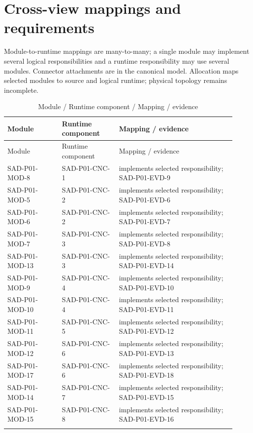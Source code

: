 \documentclass[10pt,letterpaper]{article}
\begin{document}
\section{Cross-view mappings and requirements}
Module-to-runtime mappings are many-to-many; a single module may implement several logical responsibilities and a runtime responsibility may use several modules. Connector attachments are in the canonical model. Allocation maps selected modules to source and logical runtime; physical topology remains incomplete.
\begin{longtable}{@{}>{\raggedright\arraybackslash}p{0.22\linewidth}>{\raggedright\arraybackslash}p{0.23\linewidth}>{\raggedright\arraybackslash}p{0.47\linewidth}@{}}
\caption{Module / Runtime component / Mapping / evidence}\\
\toprule Module & Runtime component & Mapping / evidence\\\midrule\endfirsthead
\toprule Module & Runtime component & Mapping / evidence\\\midrule\endhead
SAD-P01-MOD-8 & SAD-P01-CNC-1 & implements selected responsibility; SAD-P01-EVD-9\\\addlinespace
SAD-P01-MOD-5 & SAD-P01-CNC-2 & implements selected responsibility; SAD-P01-EVD-6\\\addlinespace
SAD-P01-MOD-6 & SAD-P01-CNC-2 & implements selected responsibility; SAD-P01-EVD-7\\\addlinespace
SAD-P01-MOD-7 & SAD-P01-CNC-3 & implements selected responsibility; SAD-P01-EVD-8\\\addlinespace
SAD-P01-MOD-13 & SAD-P01-CNC-3 & implements selected responsibility; SAD-P01-EVD-14\\\addlinespace
SAD-P01-MOD-9 & SAD-P01-CNC-4 & implements selected responsibility; SAD-P01-EVD-10\\\addlinespace
SAD-P01-MOD-10 & SAD-P01-CNC-4 & implements selected responsibility; SAD-P01-EVD-11\\\addlinespace
SAD-P01-MOD-11 & SAD-P01-CNC-5 & implements selected responsibility; SAD-P01-EVD-12\\\addlinespace
SAD-P01-MOD-12 & SAD-P01-CNC-6 & implements selected responsibility; SAD-P01-EVD-13\\\addlinespace
SAD-P01-MOD-17 & SAD-P01-CNC-6 & implements selected responsibility; SAD-P01-EVD-18\\\addlinespace
SAD-P01-MOD-14 & SAD-P01-CNC-7 & implements selected responsibility; SAD-P01-EVD-15\\\addlinespace
SAD-P01-MOD-15 & SAD-P01-CNC-8 & implements selected responsibility; SAD-P01-EVD-16\\\addlinespace

\end{longtable}
\end{document}
